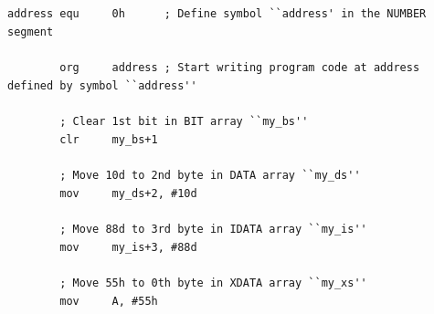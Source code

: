 \documentclass[a4paper,twoside,12pt]{book}
\begin{document}
\begin{code}[h!]
			\verb''\\
			\verb''\\
			{\color{highlight_constant}\verb'address'}\verb' '{\color{highlight_directive}\verb'equ'}\verb'     '{\color{highlight_hex}\verb'0h'}\verb'      '{\color{highlight_comment}\verb'; Define symbol ``address'\verb"'"\verb' in the NUMBER segment'}\\
			\verb''\\
			\verb'        '{\color{highlight_directive}\verb'org'}\verb'     '{\color{highlight_constant}\verb'address'}\verb' '{\color{highlight_comment}\verb'; Start writing program code at address defined by symbol ``address'\verb"'"\verb''\verb"'"\verb''}\\
			\verb''\\
			\verb'        '{\color{highlight_comment}\verb'; Clear 1st bit in BIT array ``my_bs'\verb"'"\verb''\verb"'"\verb''}\\
			\verb'        '{\color{highlight_instruction}\verb'clr'}\verb'     '{\color{highlight_constant}\verb'my_bs'}{\color{highlight_symbol}\verb'+'}{\color{highlight_unknown_base}\verb'1'}\\
			\verb''\\
			\verb'        '{\color{highlight_comment}\verb'; Move 10d to 2nd byte in DATA array ``my_ds'\verb"'"\verb''\verb"'"\verb''}\\
			\verb'        '{\color{highlight_instruction}\verb'mov'}\verb'     '{\color{highlight_constant}\verb'my_ds'}{\color{highlight_symbol}\verb'+'}{\color{highlight_unknown_base}\verb'2'}{\color{highlight_oper_sep}\verb','}\verb' '{\color{highlight_imm_dec}\verb'#10d'}\\
			\verb''\\
			\verb'        '{\color{highlight_comment}\verb'; Move 88d to 3rd byte in IDATA array ``my_is'\verb"'"\verb''\verb"'"\verb''}\\
			\verb'        '{\color{highlight_instruction}\verb'mov'}\verb'     '{\color{highlight_constant}\verb'my_is'}{\color{highlight_symbol}\verb'+'}{\color{highlight_unknown_base}\verb'3'}{\color{highlight_oper_sep}\verb','}\verb' '{\color{highlight_imm_dec}\verb'#88d'}\\
			\verb''\\
			\verb'        '{\color{highlight_comment}\verb'; Move 55h to 0th byte in XDATA array ``my_xs'\verb"'"\verb''\verb"'"\verb''}\\
			\verb'        '{\color{highlight_instruction}\verb'mov'}\verb'     '{\color{highlight_sfr}\verb'A'}{\color{highlight_oper_sep}\verb','}\verb' '{\color{highlight_imm_hex}\verb'#55h'}\\

\end{code}
\end{document}
